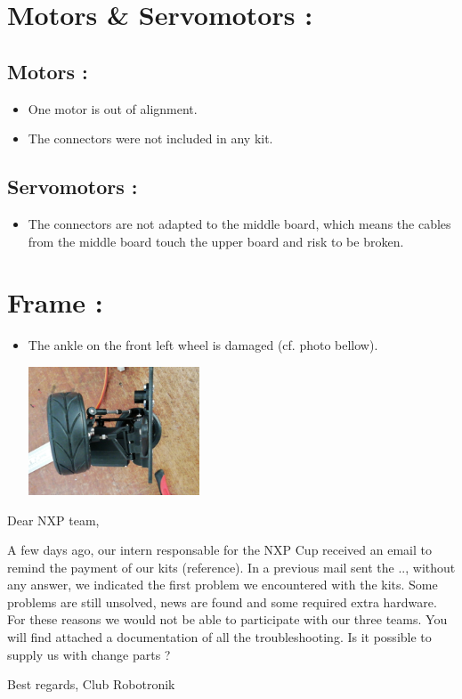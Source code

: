 \documentclass[12pt]{report}
\begin{document}
\newpage

\section*{Motors \& Servomotors :}
\subsection*{Motors :}
\begin{itemize}
	\item One motor is out of alignment.
	\item The connectors were not included in any kit.
\end{itemize}
\subsection*{Servomotors :}
\begin{itemize}
	\item The connectors are not adapted to the middle board, which means the cables from the middle board touch the upper board and risk to be broken.
\end{itemize}

\section*{Frame :}
\begin{itemize}
	\item The ankle on the front left wheel is damaged (cf. photo bellow).
	\begin{center}
		\includegraphics[width=0.4\textwidth]{wheel.jpg}
	\end{center}
\end{itemize}

\newpage

Dear NXP team,

A few days ago, our intern responsable for the NXP Cup received an email to remind the payment of our kits (reference).
In a previous mail sent the .., without any answer, we indicated the first problem we encountered with the kits.
Some problems are still unsolved, news are found and some required extra hardware.
For these reasons we would not be able to participate with our three teams. You will find attached a documentation of all the troubleshooting. 
Is it possible to supply us with change parts ?

Best regards,
Club Robotronik
\end{document}
